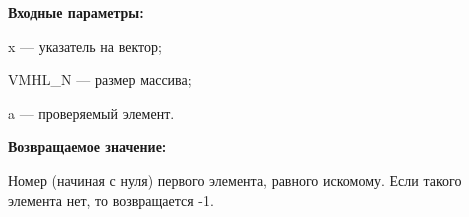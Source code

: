 \textbf{Входные параметры:}

   x --- указатель на вектор;
   
 VMHL\_N --- размер массива;
 
 a --- проверяемый элемент.

\textbf{Возвращаемое значение:}

 Номер (начиная с нуля) первого элемента, равного искомому. Если такого элемента нет, то возвращается -1.